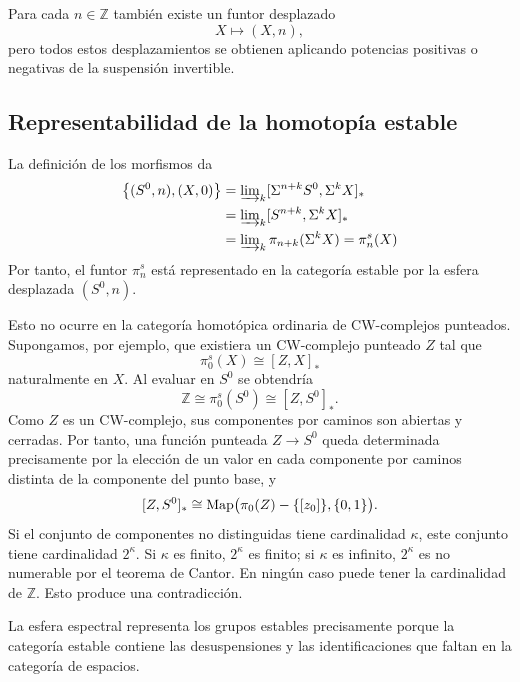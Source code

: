 Para cada \(n\in\mathbb Z\) también existe un funtor desplazado
\[
X\longmapsto(X,n),
\]
pero todos estos desplazamientos se obtienen aplicando potencias positivas o negativas de la suspensión invertible.

\subsection{Representabilidad de la homotopía estable}

La definición de los morfismos da
\[
\begin{aligned}
\bigl\{(S^0,n),(X,0)\bigr\}
&=\varinjlim\nolimits_k[\Sigma^{n+k}S^0,\Sigma^kX]_*\\
&=\varinjlim\nolimits_k[S^{n+k},\Sigma^kX]_*\\
&=\varinjlim\nolimits_k\pi_{n+k}(\Sigma^kX)=\pi_n^s(X)
\end{aligned}
\]
Por tanto, el funtor \(\pi_n^s\) está representado en la categoría estable por la esfera desplazada \((S^0,n)\).

Esto no ocurre en la categoría homotópica ordinaria de CW-complejos punteados. Supongamos, por ejemplo, que existiera un CW-complejo punteado \(Z\) tal que
\[
\pi_0^s(X)\cong[Z,X]_*
\]
naturalmente en \(X\). Al evaluar en \(S^0\) se obtendría
\[
\mathbb Z\cong\pi_0^s(S^0)\cong[Z,S^0]_*.
\]
Como \(Z\) es un CW-complejo, sus componentes por caminos son abiertas y cerradas. Por tanto, una función punteada \(Z\to S^0\) queda determinada precisamente por la elección de un valor en cada componente por caminos distinta de la componente del punto base, y
\[
[Z,S^0]_*\cong\operatorname{Map}\bigl(\pi_0(Z)-\{[z_0]\},\{0,1\}\bigr).
\]
Si el conjunto de componentes no distinguidas tiene cardinalidad \(\kappa\), este conjunto tiene cardinalidad \(2^\kappa\). Si \(\kappa\) es finito, \(2^\kappa\) es finito; si \(\kappa\) es infinito, \(2^\kappa\) es no numerable por el teorema de Cantor. En ningún caso puede tener la cardinalidad de \(\mathbb Z\). Esto produce una contradicción.

La esfera espectral representa los grupos estables precisamente porque la categoría estable contiene las desuspensiones y las identificaciones que faltan en la categoría de espacios.
